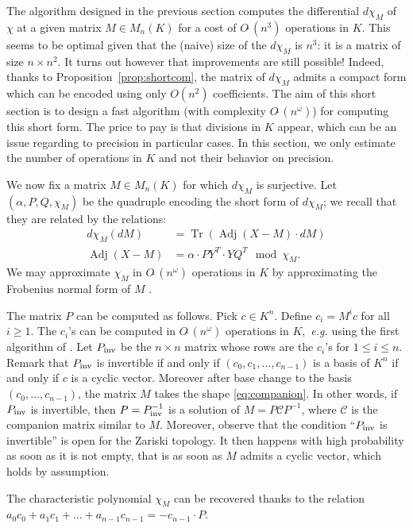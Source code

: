 \documentclass{sig-alternate-05-2015}
\DeclareMathOperator{\tr}{Tr}
\DeclareMathOperator{\adj}{Adj}
\newcommand{\softO}{O\tilde{~}}
\newcommand{\inv}{\text{\rm inv}}
\begin{document}
The algorithm designed in the previous section computes the differential 
$d \chi_M$ of $\chi$ at a given matrix $M \in M_n(K)$ for a cost of 
$\softO (n^3)$ operations in $K$. This seems to be optimal given that the 
(naive) size of the $d \chi_M$ is $n^3$: it is a matrix of size $n
\times n^2$. It turns out however that improvements are still possible!
Indeed, thanks to Proposition~\ref{prop:shortcom}, the matrix of 
$d \chi_M$ admits a compact form which can be encoded using only $O(n^2)$ 
coefficients. The aim of this short section is to design a fast 
algorithm (with complexity $\softO(n^\omega)$) for computing this short 
form. The price to pay is that divisions in $K$ appear, which can be an 
issue regarding to precision in particular cases.
In this section, we only estimate the number of operations in $K$
and not their behavior on precision.

We now fix a matrix $M \in M_n(K)$ for which $d \chi_M$ is 
surjective. Let $(\alpha, P, Q, \chi_M)$ be the quadruple encoding
the short form of $d \chi_M$; we recall that they are related by the
relations:
\begin{align*}
d \chi_M(dM) & =\tr(\adj(X{-}M) \cdot dM) \\
\adj(X{-}M) & = \alpha \cdot P Y^T \cdot Y Q^T \mod \chi_M.
\end{align*}
We may approximate $\chi_M$ in $\softO(n^\omega)$ operations in $K$
by approximating the Frobenius normal form of $M$ \cite{storjohann:01a}.

The matrix $P$ can be computed as follows. Pick $c \in K^n$. Define 
$c_i = M^i c$ for all $i \geq 1$. The $c_i$'s can be computed in 
$\softO(n^\omega)$ operations in $K,$ \textit{e.g.}
using the first algorithm
of \cite{keller-gehrig:85a}. Let $P_\inv$ be the 
$n \times n$ matrix whose rows are the $c_i$'s for $1 \leq i \leq n$. 
Remark that $P_\inv$ is invertible if and only if $(c_0, c_1, \ldots, 
c_{n-1})$ is a basis of $K^n$ if and only if $c$ is a cyclic vector. 
Moreover after base change to the basis $(c_0, \ldots, c_{n-1})$, the matrix 
$M$ takes the shape \eqref{eq:companion}. In other words, if $P_\inv$
is invertible, then $P = P_\inv^{-1}$ is a solution of $M = P \mathscr{C} P^{-1}$,
where $\mathscr{C}$ is the companion matrix similar to $M$.
Moreover, observe that the condition ``$P_\inv$ is invertible'' is open
for the Zariski topology. It then happens with high probability as soon
as it is not empty, that is as soon as $M$ admits a cyclic vector, which
holds by assumption.


The characteristic polynomial $\chi_M$ can be recovered thanks to the
relation $a_0c_0 + a_1c_1 + \dots + a_{n-1}c_{n-1} = -c_{n-1} \cdot P$.
\end{document}
